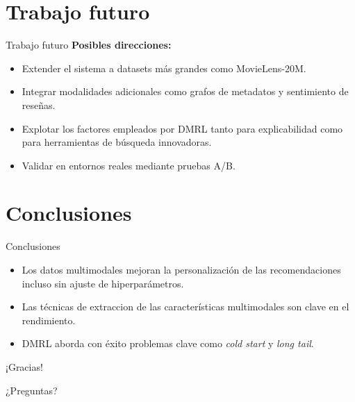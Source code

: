 \documentclass{beamer}
\begin{document}
\section{Trabajo futuro}
\begin{frame}{Trabajo futuro}
    \textbf{Posibles direcciones:}
    \begin{itemize}
        \item Extender el sistema a datasets más grandes como MovieLens-20M.
        \item Integrar modalidades adicionales como grafos de metadatos y sentimiento de reseñas.
        \item Explotar los factores empleados por DMRL tanto para explicabilidad como para herramientas de búsqueda innovadoras.
        \item Validar en entornos reales mediante pruebas A/B.
    \end{itemize}
\end{frame}

\section{Conclusiones}
\begin{frame}{Conclusiones}
    \begin{itemize}
        \item Los datos multimodales mejoran la personalización de las recomendaciones incluso sin ajuste de hiperparámetros.
        \item Las técnicas de extraccion de las características multimodales son clave en el rendimiento.
        \item DMRL aborda con éxito problemas clave como \textit{cold start} y \textit{long tail}.
    \end{itemize}
\end{frame}

\begin{frame}{¡Gracias!}
    \begin{center}
        ¿Preguntas?
    \end{center}
\end{frame}
\end{document}
